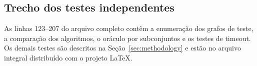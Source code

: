 


\subsection{Trecho dos testes independentes}

As linhas 123--207 do arquivo completo contêm a enumeração dos
grafos de teste, a comparação dos algoritmos, o oráculo por
subconjuntos e os testes de timeout. Os demais testes são
descritos na Seção~\ref{sec:methodology} e estão no arquivo
integral distribuído com o projeto LaTeX.


